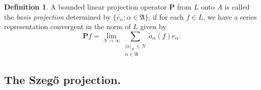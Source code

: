 \documentclass[letterpaper,11pt,reqno]{amsart}
\theoremstyle{plain}
\newtheorem{proposition}[equation]{Proposition}
\theoremstyle{definition}
\newtheorem{definition}[equation]{Definition}
\theoremstyle{remark}
\theoremstyle{remark}
\numberwithin{equation}{section}
\newcommand{\abs}[1]{\left\vert#1\right\vert}
\newcommand{\wt}{\widetilde}
\newcommand{\cx}{{\mathbb C}}
\begin{document}
\begin{definition}\label{D:basis-projection}
A bounded linear projection operator $\bm{P}$ from $L$ onto $A$ is called the \emph{basis projection} determined by $\{e_\alpha: \alpha\in \mathfrak{A}\}$, if for each $f \in L$, we have a series representation convergent in the norm of $L$ given by
\begin{equation}\label{eq-domain}
\bm{P}f = \lim_{N\to \infty} \sum_{\substack{\abs{\alpha}_\infty\leq N\\ \alpha\in \mathfrak{A} }}\wt{a}_\alpha(f) e_\alpha.
\end{equation}
\end{definition}


\subsection{The Szeg\H{o} projection.}
\end{document}
